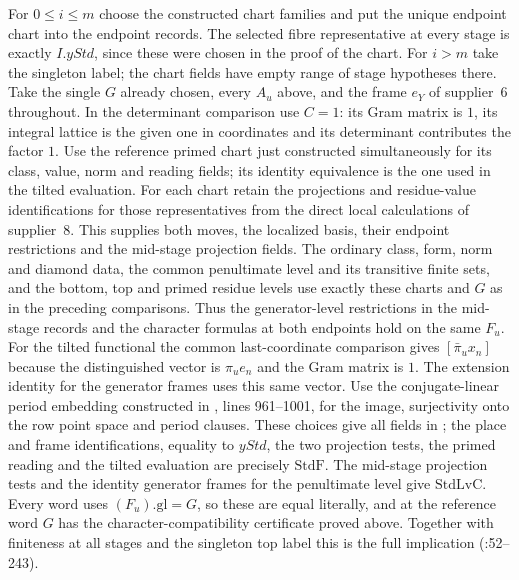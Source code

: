 For $0\le i\le m$ choose the constructed chart families and put the
unique endpoint chart into the endpoint records. The selected fibre
representative at every stage is exactly $I.yStd$, since these were
chosen in the proof of the chart. For $i>m$ take the singleton label;
the chart fields have empty range of stage hypotheses there. Take the
single $G$ already chosen, every $A_u$ above, and the frame $e_Y$ of
supplier~6 throughout. In the determinant comparison use $C=1$:
its Gram matrix is $1$, its integral lattice is the given one in
coordinates and its determinant contributes the factor $1$. Use the
reference primed chart just constructed simultaneously for its class,
value, norm and reading fields; its identity equivalence is the one used
in the tilted evaluation. For each chart retain the projections and
residue-value identifications for those representatives from the direct
local calculations of supplier~8. This supplies both moves, the localized
basis, their endpoint restrictions and the mid-stage projection fields.
The ordinary class, form, norm and diamond data, the common penultimate
level and its transitive finite sets, and the bottom, top and primed
residue levels use exactly these charts and $G$ as in the preceding
comparisons. Thus the generator-level restrictions in the mid-stage
records and the character formulas at both endpoints hold on the same
$F_u$. For the tilted functional the common last-coordinate comparison
gives $[\bar\pi_u x_n]$ because the distinguished vector is
$\pi_u e_n$ and the Gram matrix is $1$. The extension identity for
the generator frames uses this same vector. Use the conjugate-linear
period embedding constructed in , lines 961--1001,
for the image, surjectivity onto the row point space and period clauses.
These choices give all fields in ; the place and
frame identifications, equality to $yStd$, the two projection tests,
the primed reading and the tilted evaluation are precisely
$\mathrm{StdF}$. The mid-stage projection tests and the identity generator frames for the penultimate level give $\mathrm{StdLvC}$.
Every word uses $(F_u).\mathrm{gl}=G$, so these are equal literally,
and at the reference word $G$ has the character-compatibility certificate
proved above. Together with finiteness at all stages and the singleton
top label this is the full implication
(:52--243).

